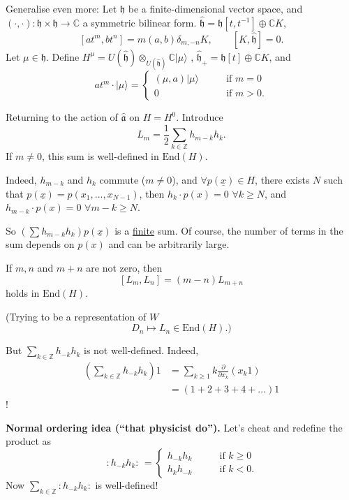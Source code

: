 \medskip\noindent
Generalise even more: Let $\mathfrak{h}$ be a
finite-dimensional
vector space, and
$(\cdot,\cdot): \mathfrak{h} \times
\mathfrak{h} \to \mathbb{C}$
a symmetric bilinear form.
$\hat{\mathfrak{h}}=\mathfrak{h}[t,t^{-1}]
\oplus
\mathbb{C}K$,
$$
[at^m,bt^n]=m(a,b)\delta_{m,-n}K,\qquad
[K,\hat{\mathfrak{h}}]=0.
$$
Let $\mu\in \mathfrak{h}$. Define
$H^\mu=U(\hat{\mathfrak{h}})
\otimes_{U(\hat{\mathfrak{h}})}\mathbb{C}
|\mu\rangle$
,
$\hat{\mathfrak{h}}_+=\mathfrak{h}[t]
\oplus\mathbb{C}K$,
and
$$
at^m\cdot |\mu\rangle=\begin{cases}
(\mu,a)|\mu\rangle\qquad &\text{if } m=0\\
0\qquad &\text{if }m>0.
\end{cases}
$$

\medskip\noindent
Returning to the action of
$\hat{\mathfrak{a}}$ on $H=H^0$. Introduce
$$
L_m=\frac{1}{2}\sum_{k \in
\mathbb{Z}}h_{m-k}h_k.
$$
If $m \neq 0$, this sum is well-defined in
$\text{End}(H)$.

Indeed, $h_{m-k}$ and $h_k$ commute ($m \neq
0$), and
$\forall  p(\underline{x})\in H$, there
exists $N$
such that
$p(\underline{x})=p(x_1,\ldots,x_{N-1})$,
then $h_k\cdot p(x)=0$ $\forall  k \geq N$,
and $h_{m-k}\cdot p(x)=0$ $\forall m-k \geq
N$.

So $(\sum h_{m-k}h_k)p(\underline{x})$ is a
\underline{finite} sum.
Of course, the number of terms in the sum
depends on $p(x)$ and can be
arbitrarily large.

\begin{exercise}
\label{exercise-hard}
If  $m,n$ and $m+n$ are not zero, then
$$
[L_m,L_n]=(m-n)L_{m+n}
$$
holds in $\text{End}(H)$.

(Trying to be a representation of $W$
 $$
D_n \mapsto L_n \in \text{End}(H).)
$$
\end{exercise}

But $\sum_{k \in \mathbb{Z}}h_{-k}h_k$ is not
well-defined.
Indeed,
$$
\begin{aligned}
\left(\sum_{k \in
\mathbb{Z}}h_{-k}h_k\right)1&=
\sum_{k \geq 1}k\frac{\partial }{\partial
x_k}(x_k 1)\\
&=(1+2+3+4+\ldots)1
\end{aligned}
$$
!

\medskip\noindent
{\bf Normal ordering idea (``that physicist
do'').} Let's cheat
and redefine the product as
$$
\,:\!h_{-k}h_k\!:\,
=\begin{cases}
h_{-k}h_k\qquad & \text{if }k\geq 0\\
h_k h_{-k}\qquad &\text{if }k<0.
\end{cases}
$$
Now $\sum_{k \in \mathbb{Z}}:\!h_{-k}h_k\!:$
is well-defined!

